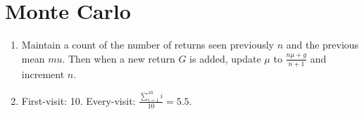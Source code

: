 \documentclass{article}
\begin{document}
\section{Monte Carlo}
\begin{enumerate}
    \item Maintain a count of the number of returns seen previously $n$ and the previous mean $mu$. Then when a new return $G$ is added, update $\mu$ to $\frac{n\mu + g}{n+1}$ and increment $n$.
    \item First-visit: 10. Every-visit: $\frac{\sum_{i=1}^{10}i}{10} = 5.5$.
\end{enumerate}
\end{document}
